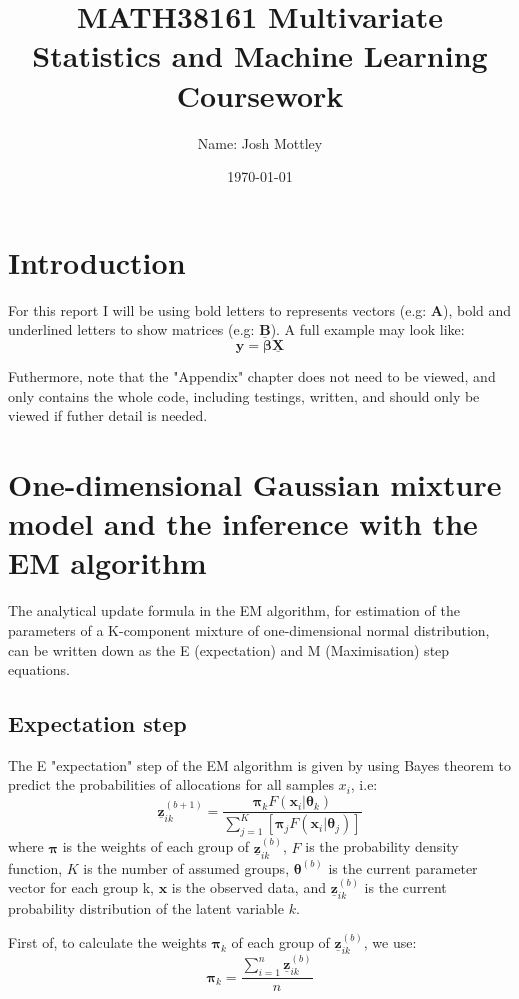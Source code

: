 \documentclass[12pt]{article}
\title{\vspace{-60pt}MATH38161 Multivariate Statistics and Machine Learning Coursework}
\author{Name: Josh Mottley}
\date{\today}
\newcommand{\vect}[1]{\boldsymbol{#1}}
\newcommand{\mat}[1]{\underline{\boldsymbol{#1}}}
\begin{document}
\maketitle

\section*{Introduction}
For this report I will be using bold letters to represents vectors (e.g: $\vect{A}$), bold and underlined letters to show matrices (e.g: $\mat{B}$). A full example may look like:
\begin{equation*}
\vect{y}=\vect{\beta}\mat{X}
\end{equation*} \par

Futhermore, note that the "Appendix" chapter does not need to be viewed, and only contains the whole code, including testings, written, and should only be viewed if futher detail is needed.

\section{One-dimensional Gaussian mixture model and the inference with the EM algorithm}
The analytical update formula in the EM algorithm, for estimation of the parameters of a K-component mixture of one-dimensional normal distribution, can be written down as the E (expectation) and M (Maximisation) step equations.
\subsection{Expectation step}
The E "expectation" step of the EM algorithm is given by using Bayes theorem to predict the probabilities of allocations for all samples $x_i$, i.e:
\begin{equation} \label{Def:Exp}
  \mat{z}_{ik}^{(b+1)} = \frac{\vect{\pi}_kF(\vect{x}_i|\vect{\theta}_k)} {\sum_{j=1}^K[\vect{\pi}_jF(\vect{x}_i|\vect{\theta}_j)]}
\end{equation}
where $\vect{\pi}$ is the weights of each group of $\mat{z}_{ik}^{(b)}$, $F$ is the probability density function, $K$ is the number of assumed groups, $\vect{\theta}^{(b)}$ is the current parameter vector for each group k, $\vect{x}$ is the observed data, and $\mat{z}_{ik}^{(b)}$ is the current probability distribution of the latent variable $k$.

First of, to calculate the weights $\vect{\pi}_k$ of each group of $\mat{z}_{ik}^{(b)}$, we use:
\begin{equation*}
  \vect{\pi}_k=\frac{\sum_{i=1}^n\mat{z}_{ik}^{(b)}}{n}
\end{equation*}
\end{document}
